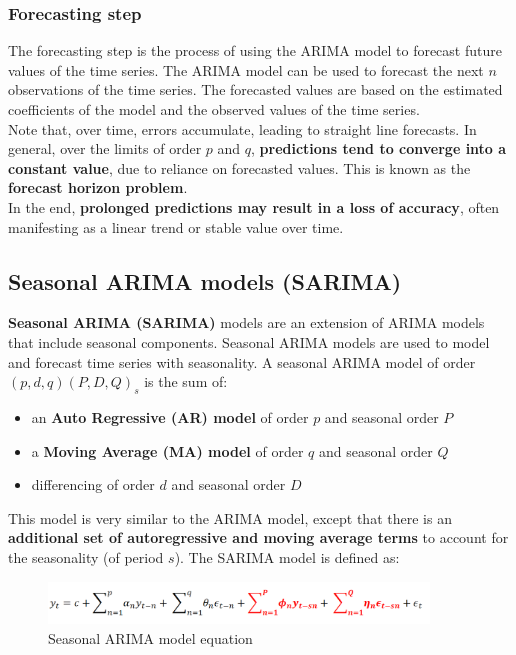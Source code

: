 \subsubsection{Forecasting step}

The forecasting step is the process of using the ARIMA model to forecast future values
of the time series. The ARIMA model can be used to forecast the next $n$ observations
of the time series. The forecasted values are based on the estimated coefficients of
the model and the observed values of the time series.\\

Note that, over time, errors accumulate, leading to straight line forecasts. In general, over 
the limits of order $p$ and $q$, \textbf{predictions tend to converge into a constant value}, due
to reliance on forecasted values. This is known as the \textbf{forecast horizon problem}.\\

In the end, \textbf{prolonged predictions may result in a loss of accuracy}, often manifesting
as a linear trend or stable value over time.

\subsection{Seasonal ARIMA models (SARIMA)}

\textbf{Seasonal ARIMA (SARIMA)} models are an extension of ARIMA models that include seasonal
components. Seasonal ARIMA models are used to model and forecast time series with
seasonality. A seasonal ARIMA model of order $(p, d, q)(P, D, Q)_s$ is the sum of:

\begin{itemize}
    \item an \textbf{Auto Regressive (AR) model} of order $p$ and seasonal order $P$
    \item a \textbf{Moving Average (MA) model} of order $q$ and seasonal order $Q$
    \item differencing of order $d$ and seasonal order $D$
\end{itemize}

This model is very similar to the ARIMA model, except that there is an \textbf{additional
set of autoregressive and moving average terms} to account for the seasonality (of
period $s$). The SARIMA model is defined as:

\begin{figure}[H]
    \centering
    \includegraphics[width=0.9\textwidth]{figures/seasonal_arima.png}
    \caption{Seasonal ARIMA model equation}
    \label{fig:seasonal_arima_eq}
\end{figure}

